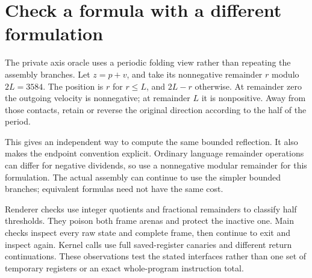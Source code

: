 \section{Check a formula with a different formulation}\label{ball-x-proof}
The private axis oracle uses a periodic folding view rather than repeating the
assembly branches. Let \(z=p+v\), and take its nonnegative remainder \(r\) modulo
\(2L=3584\). The position is \(r\) for \(r\leq L\), and \(2L-r\) otherwise.
At remainder zero the outgoing velocity is nonnegative; at remainder \(L\) it
is nonpositive. Away from those contacts, retain or reverse the original direction
according to the half of the period.

This gives an independent way to compute the same bounded reflection. It also
makes the endpoint convention explicit. Ordinary language remainder operations
can differ for negative dividends, so use a nonnegative modular remainder for
this formulation. The actual assembly can continue to use the simpler bounded
branches; equivalent formulas need not have the same cost.

Renderer checks use integer quotients and fractional remainders to classify half
thresholds. They poison both frame arenas and protect the inactive one. Main
checks inspect every raw state and complete frame, then continue to exit and
inspect again. Kernel calls use full saved-register canaries and different
return continuations. These observations test the stated interfaces rather than
one set of temporary registers or an exact whole-program instruction total.
